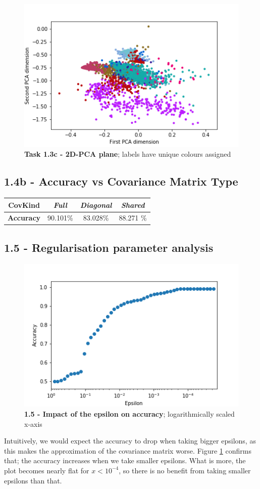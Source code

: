 \documentclass[12pt]{article}
\begin{document}
\begin{figure}[!htb]
\centering
\includegraphics[scale=0.8]{task1_3c_scatter_classes.png}
\caption{\textbf{Task 1.3c - 2D-PCA plane}; labels have unique colours assigned}
\end{figure}

\newpage

\subsection*{1.4b - Accuracy vs Covariance Matrix Type}
\begin{tabular}{|c|c|c|c|}
\hline 
\textbf{CovKind} & \emph{Full} & \emph{Diagonal} & \emph{Shared} \\ 
\hline 
\textbf{Accuracy} & 90.101\% & 83.028\% & 88.271 \% \\ 
\hline 
\end{tabular} 

\subsection*{1.5 - Regularisation parameter analysis}

\begin{figure}
\centering
\includegraphics[scale=1]{task1_4c_epsilons_accuracy.png}
\caption{\textbf{1.5 - Impact of the epsilon on accuracy}; logarithmically scaled x-axis}
\label{epsilon_analysis}
\end{figure}

Intuitively, we would expect the accuracy to drop when taking bigger epsilons, as this makes the approximation of the covariance matrix worse. Figure \ref{epsilon_analysis} confirms that; the accuracy increases when we take smaller epsilons. What is more, the plot becomes nearly flat for $x<10^{-4}$, so there is no benefit from taking smaller epsilons than that.
\end{document}
